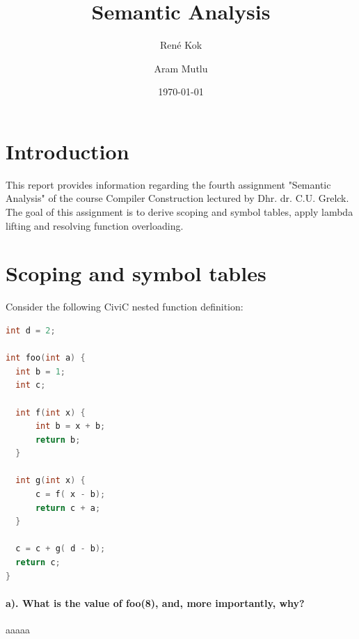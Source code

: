 \documentclass[hidelinks]{uva-inf-article}
\title{Semantic Analysis}
\author{René Kok}
\author{Aram Mutlu}
\date{\today}
\begin{document}
\maketitle


\section{Introduction}
\begin{flushleft}
\par This report provides information regarding the fourth assignment 
   "Semantic Analysis" of the course Compiler Construction lectured by Dhr. dr. C.U. Grelck. 
   The goal of this assignment is to derive scoping and symbol tables, apply lambda lifting and 
   resolving function overloading.
\newpage
\section{Scoping and symbol tables}
Consider the following CiviC nested function definition:
\begin{lstlisting}[basicstyle=\small, language=C, label=lst:code, caption=CiviC nested function definition, captionpos=b]
int d = 2;

int foo(int a) {
  int b = 1; 
  int c;

  int f(int x) { 
      int b = x + b;
      return b; 
  }

  int g(int x) { 
      c = f( x - b); 
      return c + a;
  }
    
  c = c + g( d - b); 
  return c;
}
\end{lstlisting}
\paragraph{a). What is the value of foo(8), and, more importantly, why?\\}
aaaaa

\newpage

\end{flushleft}
\end{document}

